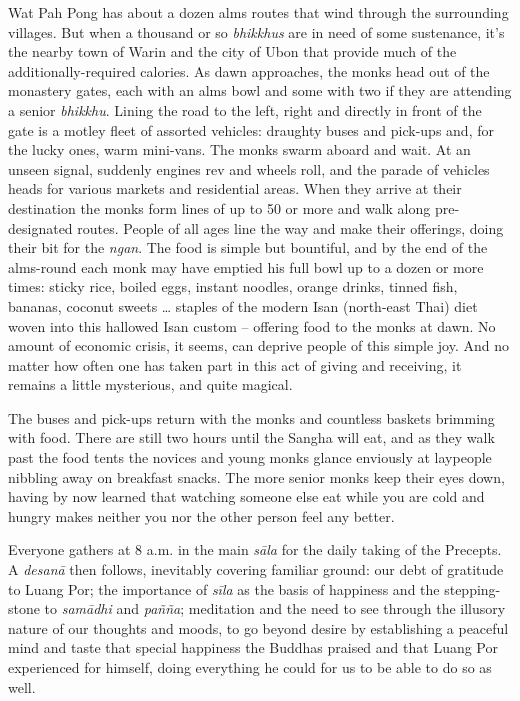 Wat Pah Pong has about a dozen alms routes that wind through the
surrounding villages. But when a thousand or so \emph{bhikkhus} are in need of
some sustenance, it's the nearby town of Warin and the city of Ubon that
provide much of the additionally-required calories. As dawn approaches, 
the monks head out of the monastery gates, each with an alms bowl and
some with two if they are attending a senior \emph{bhikkhu}. Lining the
road to the left, right and directly in front of the gate is a motley
fleet of assorted vehicles: draughty buses and pick-ups and, for the
lucky ones, warm mini-vans. The monks swarm aboard and wait. At an
unseen signal, suddenly engines rev and wheels roll, and the parade of
vehicles heads for various markets and residential areas. When they
arrive at their destination the monks form lines of up to 50 or more
and walk along pre-designated routes. People of all ages line the way
and make their offerings, doing their bit for the \emph{ngan}. The food
is simple but bountiful, and by the end of the alms-round each monk may
have emptied his full bowl up to a dozen or more times: sticky rice, 
boiled eggs, instant noodles, orange drinks, tinned fish, bananas, 
coconut sweets \ldots{} staples of the modern Isan (north-east Thai)
diet woven into this hallowed Isan custom -- offering food to the monks
at dawn. No amount of economic crisis, it seems, can deprive people of
this simple joy. And no matter how often one has taken part in this act
of giving and receiving, it remains a little mysterious, and quite
magical. 

The buses and pick-ups return with the monks and countless baskets
brimming with food. There are still two hours until the Sangha will eat, 
and as they walk past the food tents the novices and young monks glance
enviously at laypeople nibbling away on breakfast snacks. The more
senior monks keep their eyes down, having by now learned that watching
someone else eat while you are cold and hungry makes neither you nor the
other person feel any better. 

Everyone gathers at 8 a.m. in the main \emph{sāla} for the daily taking
of the Precepts. A \emph{desanā} then follows, inevitably covering
familiar ground: our debt of gratitude to Luang Por; the importance of
\emph{sīla} as the basis of happiness and the stepping-stone to
\emph{samādhi} and \emph{pañña}; meditation and the need to see through
the illusory nature of our thoughts and moods, to go beyond desire by
establishing a peaceful mind and taste that special happiness the
Buddhas praised and that Luang Por experienced for himself, doing
everything he could for us to be able to do so as well. 

